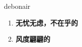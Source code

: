 
\begin{frame}
{\huge debonair}
\begin{center}
\begin{enumerate}\Large
  \item \textbf{无忧无虑，不在乎的}
  \item \textbf{风度翩翩的}
\end{enumerate}
\end{center}
\end{frame}
